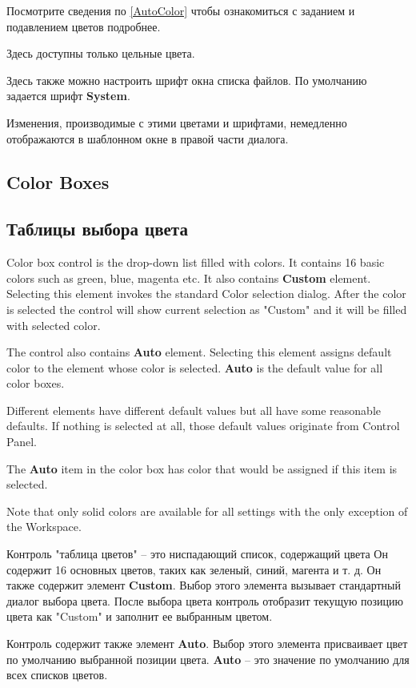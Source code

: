 Посмотрите сведения по \ref{AutoColor} чтобы ознакомиться с заданием
и подавлением цветов подробнее.
 
Здесь доступны только цельные цвета.

Здесь также можно настроить шрифт окна списка файлов. По умолчанию
задается шрифт {\bf System}.                                 

Изменения, производимые с этими цветами и шрифтами, немедленно отображаются в 
шаблонном окне в правой части диалога.
\fi
\ifenglish
\subsection{Color Boxes}
\else
\subsection{Таблицы выбора цвета}
\fi
{}

\ifenglish
Color box control is the drop-down list filled with colors. It contains 16 basic
colors such as green, blue, magenta etc. It also contains {\bf Custom} element.
Selecting this element invokes the standard Color selection dialog. After the
color is selected the control will show current selection as "Custom" and it
will be filled with selected color.

The control also contains {\bf Auto} element. Selecting this element assigns
default color to the element whose color is selected. {\bf Auto} is the
default value for all color boxes.

Different elements have different default values but all have some reasonable
defaults. If nothing is selected at all, those default values originate from
Control Panel.

The {\bf Auto} item in the color box has color that would be assigned if
this item is selected.

Note that only solid colors are available for all settings with the only
exception of the Workspace.

\else
Контроль "таблица цветов" -- это ниспадающий список, содержащий цвета Он содержит
16 основных цветов, таких как зеленый, синий, магента и т. д. Он также содержит 
элемент {\bf Custom}. Выбор этого элемента вызывает стандартный диалог выбора
цвета. После выбора цвета контроль отобразит текущую позицию цвета как "Custom"
и заполнит ее выбранным цветом.

Контроль содержит также элемент {\bf Auto}. Выбор этого элемента присваивает
цвет по умолчанию выбранной позиции цвета. {\bf Auto} -- это значение по 
умолчанию для всех списков цветов.

